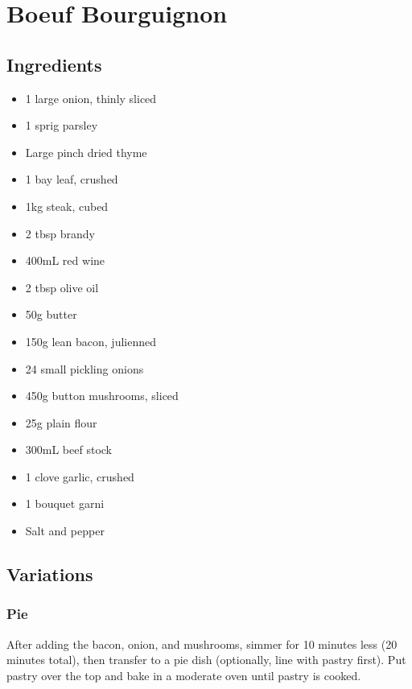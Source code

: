 \section{Boeuf Bourguignon}


  \begin{multicols}{2}
    \subsection{Ingredients}
      \begin{itemize}[noitemsep]
        \item 1 large onion, thinly sliced
        \item 1 sprig parsley
        \item Large pinch dried thyme
        \item 1 bay leaf, crushed
        \item 1kg steak, cubed
        \item 2 tbsp brandy
        \item 400mL red wine
        \item 2 tbsp olive oil
        \item 50g butter
        \item 150g lean bacon, julienned
        \item 24 small pickling onions
        \item 450g button mushrooms, sliced
        \item 25g plain flour
        \item 300mL beef stock
        \item 1 clove garlic, crushed
        \item 1 bouquet garni
        \item Salt and pepper
      \end{itemize}

      \subsection{Variations}
        \subsubsection{Pie}
          After adding the bacon, onion, and mushrooms, simmer for 10 minutes less (20 minutes total), then transfer to a pie dish (optionally, line with pastry first). Put pastry over the top and bake in a moderate oven until pastry is cooked.


\end{multicols}
